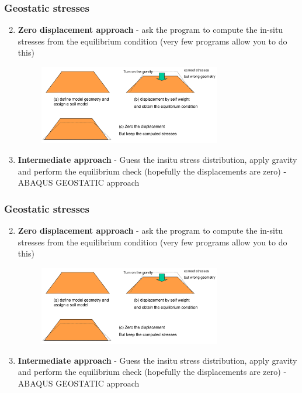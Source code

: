 \documentclass[notes]{beamer}
\begin{document}
\begin{frame}
\frametitle{Geostatic stresses}
\begin{enumerate}
	\setcounter{enumi}{1}
	\item \textbf{Zero displacement approach} - ask the program to compute the in-situ stresses
		from the equilibrium condition (very few programs allow you to do this)
		\begin{figure}[ht]
			\centering
			\includegraphics[width=0.75\textwidth]{figs/geostatic-stresses-zero-disp.png}
		\end{figure}
	\item \textbf{Intermediate approach} - Guess the insitu stress distribution, apply gravity and
	perform the equilibrium check (hopefully the displacements are zero) - ABAQUS
	GEOSTATIC approach
\end{enumerate}	
\end{frame}

\begin{frame}
\frametitle{Geostatic stresses}
\begin{enumerate}
	\setcounter{enumi}{1}
	\item \textbf{Zero displacement approach} - ask the program to compute the in-situ stresses
	from the equilibrium condition (very few programs allow you to do this)
	\begin{figure}[ht]
		\centering
		\includegraphics[width=0.75\textwidth]{figs/geostatic-stresses-zero-disp.png}
	\end{figure}
	\item \textbf{Intermediate approach} - Guess the insitu stress distribution, apply gravity and
	perform the equilibrium check (hopefully the displacements are zero) - ABAQUS
	GEOSTATIC approach
\end{enumerate}	
\end{frame}
\end{document}
